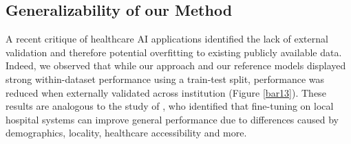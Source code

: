 \documentclass{article}
\theoremstyle{plain}
\theoremstyle{definition}
\theoremstyle{remark}
\begin{document}
{%



\subsection{Generalizability of our Method}

A recent critique of healthcare AI applications identified the lack of external validation and therefore potential overfitting to existing publicly available data. Indeed, we observed that while our approach and our reference models displayed strong within-dataset performance using a train-test split, performance was reduced when externally validated across institution (Figure \ref{bar13}).
These results are analogous to the study of \citep{jiang2023health}, who identified that fine-tuning on local hospital systems can improve general performance due to differences caused by demographics, locality, healthcare accessibility and more. 

}
\end{document}
